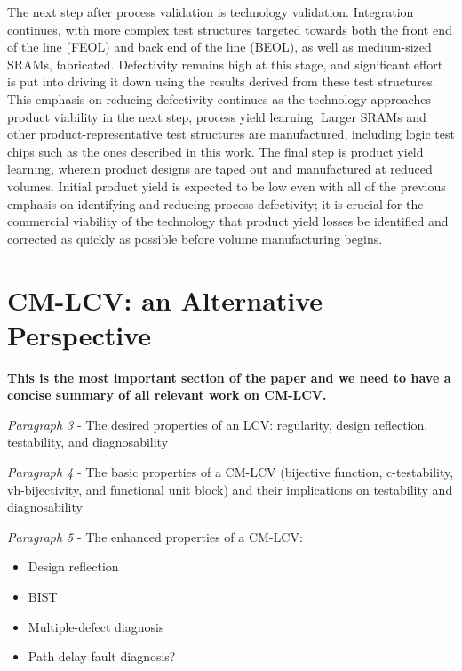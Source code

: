 \documentclass[journal]{IEEEtran}
\begin{document}
The next step after process validation is technology validation. Integration continues, with more complex test structures targeted towards both the front end of the line (FEOL) and back end of the line (BEOL), as well as medium-sized SRAMs, fabricated. Defectivity remains high at this stage, and significant effort is put into driving it down using the results derived from these test structures. This emphasis on reducing defectivity continues as the technology approaches product viability in the next step, process yield learning. Larger SRAMs and other product-representative test structures are manufactured, including logic test chips such as the ones described in this work. The final step is product yield learning, wherein product designs are taped out and manufactured at reduced volumes. Initial product yield is expected to be low even with all of the previous emphasis on identifying and reducing process defectivity; it is crucial for the commercial viability of the technology that product yield losses be identified and corrected as quickly as possible before volume manufacturing begins.

\section{CM-LCV: an Alternative Perspective} \label{cm_lcv_background}
\textbf{This is the most important section of the paper and we need to have a concise summary of all relevant work on CM-LCV.}

\textit{Paragraph 3} - The desired properties of an LCV: regularity, design reflection, testability, and diagnosability

\textit{Paragraph 4} - The basic properties of a CM-LCV \cite{lcv_prop} (bijective function, c-testability, vh-bijectivity, and functional unit block) and their implications on testability and diagnosability

\textit{Paragraph 5} - The enhanced properties of a CM-LCV: 

	\begin{itemize}
		\item Design reflection \cite{lcv_reflect_1}\cite{lcv_reflect_2}\cite{lcv_reflect_3}\cite{lcv_reflect_4}
		\item BIST \cite{lcv_bist}
		\item Multiple-defect diagnosis \cite{lcv_mult}
		\item Path delay fault diagnosis?
	\end{itemize}
	
%	
\end{document}
